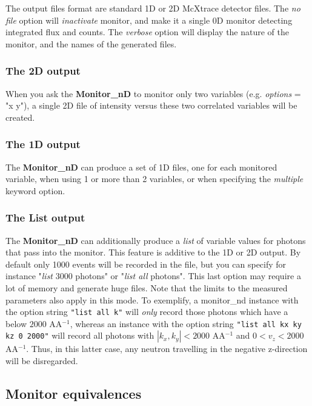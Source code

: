 The output files format are standard 1D or 2D McXtrace detector files.
The \textit{no file} option will \textit{inactivate} monitor, and make it a
single 0D monitor detecting integrated flux and counts.
The \textit{verbose} option will display the nature of the monitor, and the
names of the generated files.

\subsubsection{The 2D output}

When you ask the \textbf{Monitor\_nD} to monitor only two variables (e.g.
\textit{options} = "x y"), a single 2D file of intensity versus these two
correlated variables will be created.

\subsubsection{The 1D output}

The \textbf{Monitor\_nD} can produce a set of 1D files, one for each
monitored variable, when using 1 or more than 2 variables, or when
specifying the \textit{multiple} keyword option.

\subsubsection{The List output}

The \textbf{Monitor\_nD} can additionally produce a \textit{list} of variable
values for photons that pass into the monitor. This feature is additive
to the 1D or 2D output. By default only 1000 events will be recorded in
the file, but you can specify for instance "\textit{list} 3000 photons" or
"\textit{list all} photons". This last option may require a lot of
memory and generate huge files. Note that the limits to the measured parameters also apply in this mode.
To exemplify, a monitor\_nd instance with the option string \verb+"list all k"+ will \emph{only} record those photons which have a  below $2000$ AA$^{-1}$,
whereas an instance with the option string \verb+"list all kx ky kz 0 2000"+ will record all photons with $|k_x,k_y|<2000$ AA$^{-1}$ and $0<v_z<2000$ AA$^{-1}$. 
Thus, in this latter case, any neutron travelling in the negative z-direction will be disregarded.

\subsection{Monitor equivalences}

